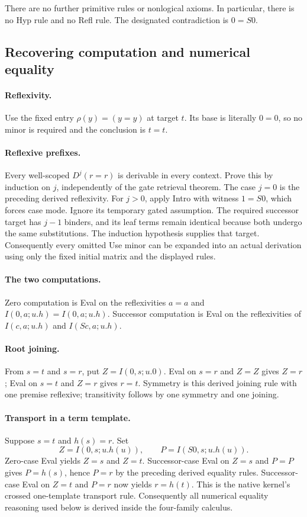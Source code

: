 There are no further primitive rules or nonlogical axioms.  In
particular, there is no Hyp rule and no Refl rule.  The designated
contradiction is $0=S0$.

\subsection{Recovering computation and numerical equality}

\paragraph{Reflexivity.}
Use the fixed entry $\rho(y)=(y=y)$ at target $t$.  Its base is literally
$0=0$, so no minor is required and the conclusion is $t=t$.


\paragraph{Reflexive prefixes.}
Every well-scoped $D^j(r=r)$ is derivable in every context.  Prove this
by induction on $j$, independently of the gate retrieval theorem.  The
case $j=0$ is the preceding derived reflexivity.  For $j>0$, apply Intro
with witness $1=S0$, which forces case mode.  Ignore its temporary gated
assumption.  The required successor target has $j-1$ binders, and its
leaf terms remain identical because both undergo the same substitutions.
The induction hypothesis supplies that target.  Consequently every
omitted Use minor can be expanded into an actual derivation using only
the fixed initial matrix and the displayed rules.

\paragraph{The two computations.}
Zero computation is Eval on the reflexivities $a=a$ and
$I(0,a;u.h)=I(0,a;u.h)$.  Successor computation is Eval on the
reflexivities of $I(c,a;u.h)$ and $I(Sc,a;u.h)$.

\paragraph{Root joining.}
From $s=t$ and $s=r$, put $Z=I(0,s;u.0)$.  Eval on $s=r$ and $Z=Z$
gives $Z=r$; Eval on $s=t$ and $Z=r$ gives $r=t$.  Symmetry is this
derived joining rule with one premise reflexive; transitivity follows by
one symmetry and one joining.

\paragraph{Transport in a term template.}
Suppose $s=t$ and $h(s)=r$.  Set
\[
 Z=I(0,s;u.h(u)),\qquad P=I(S0,s;u.h(u)).
\]
Zero-case Eval yields $Z=s$ and $Z=t$.  Successor-case Eval on $Z=s$
and $P=P$ gives $P=h(s)$, hence $P=r$ by the preceding derived equality
rules.  Successor-case Eval on $Z=t$ and $P=r$ now yields $r=h(t)$.
This is the native kernel's crossed one-template transport rule.
Consequently all numerical equality reasoning used below is derived
inside the four-family calculus.

